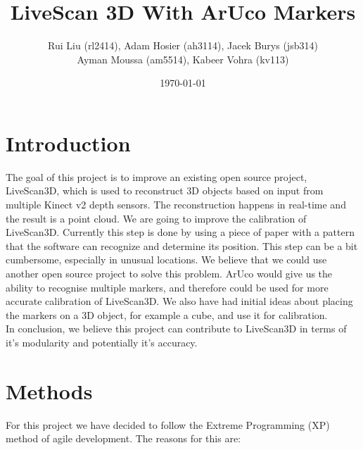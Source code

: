 \documentclass[a4paper,12pt]{report}
\title{LiveScan 3D With ArUco Markers}
\author{Rui Liu (rl2414), Adam Hosier (ah3114), Jacek Burys (jsb314)\\Ayman Moussa (am5514), Kabeer Vohra (kv113)}
\date{\today}
\begin{document}
\maketitle

\iffalse
The intent of this project is to introduce an improvement on an open source real time 3D reconstruction library, LiveScan3D (https://github.com/MarekKowalski/LiveScan3D).
LiveScan3D is a system designed for 3D reconstruction using multiple Kinect v2 depth sensors simultaneously in real time.
This library contains code for calibration of the relative postitions of different sensors. However, this part is a bit cumbersome.
The goal is to use another library, ArUco (http://www.uco.es/investiga/grupos/ava/node/26) to simplify, and potentually improve the accuracy of the calibration process. 
\fi

\section*{Introduction}

The goal of this project is to improve an existing open source project,
LiveScan3D, which is used to reconstruct 3D objects based on input from 
multiple Kinect v2 depth sensors. The reconstruction happens in real-time 
and the result is a point cloud. 
We are going to improve the calibration of LiveScan3D. Currently this step is
done by using a piece of paper with a pattern that the software can
recognize and determine its position. This step can be a bit cumbersome,
especially in unusual locations. 
We believe that we could use another open source project to solve this problem.
ArUco would give us the ability to recognise multiple markers, and therefore
could be used for more accurate calibration of LiveScan3D. We also have had
initial ideas about placing the markers on a 3D object, for example a cube,
and use it for calibration. \\

\noindent In conclusion, we believe this project can contribute to LiveScan3D in terms of
it's modularity and potentially it's accuracy.

\section*{Methods}
For this project we have decided to follow the Extreme Programming (XP) method of agile development. The reasons for this are:
\end{document}
